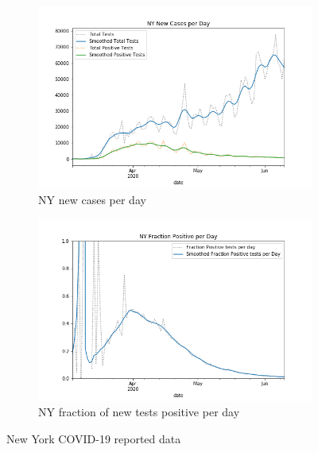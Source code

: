 \documentclass[12pt]{article}
\begin{document}
\begin{figure}[!th]
\centering
\begin{subfigure}{.5\textwidth}
  \centering
  \includegraphics[width=.9\linewidth]{../methods/figs/NY_casecount.png}
  \caption{NY new cases per day}
  \label{fig:ny-covid-test}
\end{subfigure}%
\begin{subfigure}{.5\textwidth}
  \centering
  \includegraphics[width=.9\linewidth]{../methods/figs/NY_fracpos.png}
  \caption{NY fraction of new tests positive per day}
  \label{fig:ny-covid-frac}
\end{subfigure}
\caption{New York COVID-19 reported data }
\label{fig:ny-covid}
\end{figure}



\end{document}
